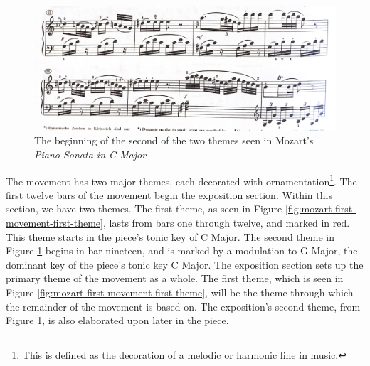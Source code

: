 \begin{figure}
    \centering
    \includegraphics[width=\textwidth]{figures/mozart-first-movement-second-theme.jpg}
    \caption[The second theme in Mozart's \textit{Piano Sonata in C Major, K. 330}]{The beginning of the second of the two themes seen in Mozart's \textit{Piano Sonata in C Major}}
    \label{fig:mozart-first-movement-second-theme}
\end{figure}

The movement has two major themes, each decorated with ornamentation\footnote{This is defined as the decoration of a melodic or harmonic line in music.}\autocite{Latham_2011a}\autocite{Burkholder_Grout_Palisca_2014}. The first twelve bars of the movement begin the exposition section. Within this section, we have two themes. The first theme, as seen in Figure \ref{fig:mozart-first-movement-first-theme}\autocite{Henle_1977}, lasts from bars one through twelve, and marked in red. This theme starts in the piece's tonic key of C Major. The second theme in Figure \ref{fig:mozart-first-movement-second-theme}\autocite{Henle_1977} begins in bar nineteen, and is marked by a modulation to G Major, the dominant key of the piece's tonic key C Major. The exposition section sets up the primary theme of the movement as a whole. The first theme, which is seen in Figure \ref{fig:mozart-first-movement-first-theme}\autocite{Henle_1977}, will be the theme through which the remainder of the movement is based on. The exposition's second theme, from Figure \ref{fig:mozart-first-movement-second-theme}\autocite{Henle_1977}, is also elaborated upon later in the piece. 

